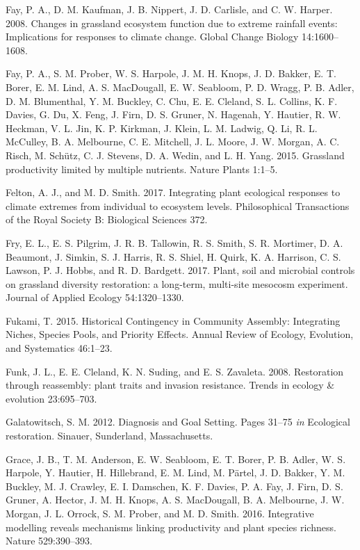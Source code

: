 \documentclass[twoside,12pt,final]{ucthesis-CA2012}
\begin{document}
\begin{ucmainmatter}
\leavevmode\hypertarget{ref-Fay2008}{}%
Fay, P. A., D. M. Kaufman, J. B. Nippert, J. D. Carlisle, and C. W. Harper. 2008. Changes in grassland ecosystem function due to extreme rainfall events: Implications for responses to climate change. Global Change Biology 14:1600--1608.

\leavevmode\hypertarget{ref-Fay2015}{}%
Fay, P. A., S. M. Prober, W. S. Harpole, J. M. H. Knops, J. D. Bakker, E. T. Borer, E. M. Lind, A. S. MacDougall, E. W. Seabloom, P. D. Wragg, P. B. Adler, D. M. Blumenthal, Y. M. Buckley, C. Chu, E. E. Cleland, S. L. Collins, K. F. Davies, G. Du, X. Feng, J. Firn, D. S. Gruner, N. Hagenah, Y. Hautier, R. W. Heckman, V. L. Jin, K. P. Kirkman, J. Klein, L. M. Ladwig, Q. Li, R. L. McCulley, B. A. Melbourne, C. E. Mitchell, J. L. Moore, J. W. Morgan, A. C. Risch, M. Schütz, C. J. Stevens, D. A. Wedin, and L. H. Yang. 2015. Grassland productivity limited by multiple nutrients. Nature Plants 1:1--5.

\leavevmode\hypertarget{ref-Felton2017}{}%
Felton, A. J., and M. D. Smith. 2017. Integrating plant ecological responses to climate extremes from individual to ecosystem levels. Philosophical Transactions of the Royal Society B: Biological Sciences 372.

\leavevmode\hypertarget{ref-Fry2017}{}%
Fry, E. L., E. S. Pilgrim, J. R. B. Tallowin, R. S. Smith, S. R. Mortimer, D. A. Beaumont, J. Simkin, S. J. Harris, R. S. Shiel, H. Quirk, K. A. Harrison, C. S. Lawson, P. J. Hobbs, and R. D. Bardgett. 2017. Plant, soil and microbial controls on grassland diversity restoration: a long-term, multi-site mesocosm experiment. Journal of Applied Ecology 54:1320--1330.

\leavevmode\hypertarget{ref-Fukami2015}{}%
Fukami, T. 2015. Historical Contingency in Community Assembly: Integrating Niches, Species Pools, and Priority Effects. Annual Review of Ecology, Evolution, and Systematics 46:1--23.

\leavevmode\hypertarget{ref-Funk2008}{}%
Funk, J. L., E. E. Cleland, K. N. Suding, and E. S. Zavaleta. 2008. Restoration through reassembly: plant traits and invasion resistance. Trends in ecology \& evolution 23:695--703.

\leavevmode\hypertarget{ref-Galatowitsch2012}{}%
Galatowitsch, S. M. 2012. Diagnosis and Goal Setting. Pages 31--75 \emph{in} Ecological restoration. Sinauer, Sunderland, Massachusetts.

\leavevmode\hypertarget{ref-Grace2016a}{}%
Grace, J. B., T. M. Anderson, E. W. Seabloom, E. T. Borer, P. B. Adler, W. S. Harpole, Y. Hautier, H. Hillebrand, E. M. Lind, M. Pärtel, J. D. Bakker, Y. M. Buckley, M. J. Crawley, E. I. Damschen, K. F. Davies, P. A. Fay, J. Firn, D. S. Gruner, A. Hector, J. M. H. Knops, A. S. MacDougall, B. A. Melbourne, J. W. Morgan, J. L. Orrock, S. M. Prober, and M. D. Smith. 2016. Integrative modelling reveals mechanisms linking productivity and plant species richness. Nature 529:390--393.


\end{ucmainmatter}
\end{document}
